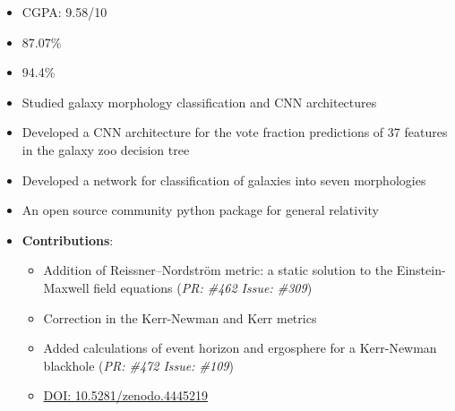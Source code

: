 \documentclass[10pt,a4paper,ragged2e,withhyper]{altacv}
\begin{document}
\begin{paracol}{2}


\switchcolumn

\begin{itemize}
    \item CGPA: 9.58/10
\end{itemize}

\begin{itemize}
    \item 87.07\%
\end{itemize}

\begin{itemize}
    \item 94.4\%
\end{itemize}

\begin{itemize}
    \item Studied galaxy morphology classification and CNN architectures
    \item Developed a CNN architecture for the vote fraction predictions of 37 features in the galaxy zoo decision tree
    \item Developed a network for classification of galaxies into seven morphologies
\end{itemize}
\begin{itemize}
    \item An open source community python package for general relativity
    \item \textbf{Contributions}:
    \begin{itemize}
        \item Addition of  Reissner–Nordström metric: a static solution to the Einstein-Maxwell field equations (\textit{PR: \#462 Issue: \#309})
        \item Correction in the Kerr-Newman and Kerr metrics
        \item Added calculations of event horizon and ergosphere for a Kerr-Newman blackhole (\textit{PR: \#472 Issue: \#109}) 
        \item \href{https://doi.org/10.5281/zenodo.4445219
}{DOI: 10.5281/zenodo.4445219}
    \end{itemize}
\end{itemize}
\nocite{*}
\printbibliography[heading=pubtype,title={\printinfo{\faFile*[regular]}{Journal Articles}}, type=misc]
\end{paracol}
\end{document}
